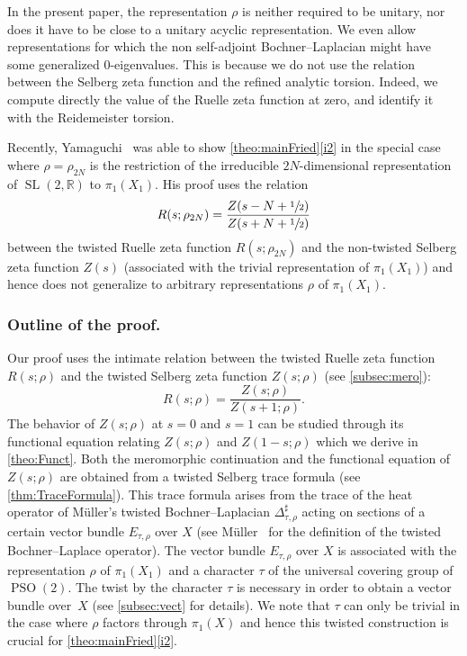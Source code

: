 \documentclass[JEP,XML,SOM,Unicode,NoFloatCountersInSection,published]{cedram}
\theoremstyle{plain}
\theoremstyle{definition}
\theoremstyle{remark}
\newcommand{\R}{\mathbb{R}}
\DeclareMathOperator{\SL}{SL}
\DeclareMathOperator{\PSO}{PSO}
\numberwithin{equation}{section}
\begin{document}
In the present paper, the representation $\rho$ is neither required to be unitary, nor does it have to be close to a unitary acyclic representation. We even allow representations for which the non self-adjoint Bochner--Laplacian might have some generalized $0$\nobreakdash-eigenvalues.
This is because we do not use the relation between the Selberg zeta function and the refined analytic torsion. Indeed, we compute directly the value of the Ruelle zeta function at zero, and identify it with the Reidemeister torsion.

Recently, Yamaguchi~\cite{yamaguchi2020dynamical} was able to show \cref{theo:mainFried}\eqref{i2} in the special case where $\rho=\rho_{2N}$ is the restriction of the irreducible $2N$-dimensional representation of $\SL(2,\R)$ to $\pi_1(X_1)$.
His proof uses the relation
\[
R(s;\rho_{2N}) = \frac{Z(s-N+\sfrac{1}{2})}{Z(s+N+\sfrac{1}{2})}
\]
between the twisted Ruelle zeta function $R(s;\rho_{2N})$ and the non-twisted Selberg zeta function $Z(s)$ (associated with the trivial representation of $\pi_1(X_1)$) and hence does not generalize to arbitrary representations $\rho$ of $\pi_1(X_1)$.


\subsubsection*{Outline of the proof.}

Our proof uses the intimate relation between the twisted Ruelle zeta function $R(s;\rho)$ and the twisted Selberg zeta function $Z(s;\rho)$ (see \cref{subsec:mero}):
\[
R(s;\rho) = \frac{Z(s;\rho)}{Z(s+1;\rho)}.
\]
The behavior of $Z(s;\rho)$ at $s=0$ and $s=1$ can be studied through its functional equation relating $Z(s;\rho)$ and $Z(1-s;\rho)$ which we derive in \cref{theo:Funct}. Both the meromorphic continuation and the functional equation of $Z(s;\rho)$ are obtained from a twisted Selberg trace formula (see \cref{thm:TraceFormula}). This trace formula arises from the trace of the heat operator of Müller's twisted Bochner--Laplacian $\Delta_{\tau,\rho}^\sharp$ acting on sections of a certain vector bundle $E_{\tau,\rho}$ over $X$ (see Müller~\cite[\S 4]{M1} for the definition of the twisted Bochner--Laplace operator). The vector bundle $E_{\tau,\rho}$ over $X$ is associated with the representation $\rho$ of $\pi_1(X_1)$ and a character $\tau$ of the universal covering group of $\PSO(2)$. The twist by the character $\tau$ is necessary in order to obtain a vector bundle over~$X$ (see \cref{subsec:vect} for details). We note that $\tau$ can only be trivial in the case where $\rho$ factors through $\pi_1(X)$ and hence this twisted construction is crucial for \cref{theo:mainFried}\eqref{i2}.
\end{document}
